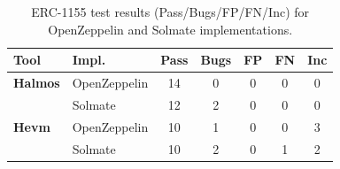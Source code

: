 \begin{table}[htb]
\centering
\begin{scriptsize}
\begin{tabular}{llccccc}
\toprule
\textbf{Tool} & \textbf{Impl.} & \textbf{Pass} & \textbf{Bugs} & \textbf{FP} & \textbf{FN} & \textbf{Inc} \\
\midrule
\textbf{Halmos} & OpenZeppelin & 14 & 0 & 0 & 0 & 0 \\
 & Solmate & 12 & 2 & 0 & 0 & 0 \\
\textbf{Hevm} & OpenZeppelin & 10 & 1 & 0 & 0 & 3 \\
 & Solmate & 10 & 2 & 0 & 1 & 2 \\
\bottomrule
\end{tabular}
\end{scriptsize}
\caption{ERC-1155 test results (Pass/Bugs/FP/FN/Inc) for OpenZeppelin and Solmate implementations.}
\label{tab:test_results_erc1155}
\end{table}
